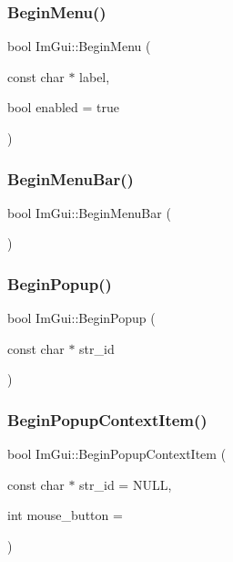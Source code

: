 \subsubsection{\texorpdfstring{Begin\+Menu()}{BeginMenu()}}
{\footnotesize\ttfamily bool Im\+Gui\+::\+Begin\+Menu (\begin{DoxyParamCaption}\item[{const char $\ast$}]{label,  }\item[{bool}]{enabled = {\ttfamily true} }\end{DoxyParamCaption})}

\hypertarget{namespace_im_gui_a4852dff802922163fc747e2e0df5b88f}{}\label{namespace_im_gui_a4852dff802922163fc747e2e0df5b88f} 
\subsubsection{\texorpdfstring{Begin\+Menu\+Bar()}{BeginMenuBar()}}
{\footnotesize\ttfamily bool Im\+Gui\+::\+Begin\+Menu\+Bar (\begin{DoxyParamCaption}{ }\end{DoxyParamCaption})}

\hypertarget{namespace_im_gui_ab71527de4b52ff970e5396040302e134}{}\label{namespace_im_gui_ab71527de4b52ff970e5396040302e134} 
\subsubsection{\texorpdfstring{Begin\+Popup()}{BeginPopup()}}
{\footnotesize\ttfamily bool Im\+Gui\+::\+Begin\+Popup (\begin{DoxyParamCaption}\item[{const char $\ast$}]{str\+\_\+id }\end{DoxyParamCaption})}

\hypertarget{namespace_im_gui_a579fc507f5b5d164c8fd628aee3d7bbd}{}\label{namespace_im_gui_a579fc507f5b5d164c8fd628aee3d7bbd} 
\subsubsection{\texorpdfstring{Begin\+Popup\+Context\+Item()}{BeginPopupContextItem()}}
{\footnotesize\ttfamily bool Im\+Gui\+::\+Begin\+Popup\+Context\+Item (\begin{DoxyParamCaption}\item[{const char $\ast$}]{str\+\_\+id = {\ttfamily NULL},  }\item[{int}]{mouse\+\_\+button = {} }\end{DoxyParamCaption})}

